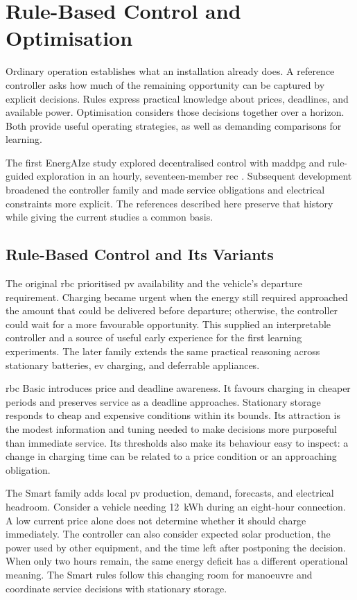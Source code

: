 \section{Rule-Based Control and Optimisation}
\label{sec:rbc-ladder}

Ordinary operation establishes what an installation already does. A reference controller asks how much of the remaining opportunity can be captured by explicit decisions. Rules express practical knowledge about prices, deadlines, and available power. Optimisation considers those decisions together over a horizon. Both provide useful operating strategies, as well as demanding comparisons for learning.

The first EnergAIze study explored decentralised control with \gls{maddpg} and rule-guided exploration in an hourly, seventeen-member \gls{rec} \parencite{fonseca2024energAIze}. Subsequent development broadened the controller family and made service obligations and electrical constraints more explicit. The references described here preserve that history while giving the current studies a common basis.

\subsection{Rule-Based Control and Its Variants}

The original \gls{rbc} prioritised \gls{pv} availability and the vehicle's departure requirement. Charging became urgent when the energy still required approached the amount that could be delivered before departure; otherwise, the controller could wait for a more favourable opportunity. This supplied an interpretable controller and a source of useful early experience for the first learning experiments. The later family extends the same practical reasoning across stationary batteries, \gls{ev} charging, and deferrable appliances.

\gls{rbc} Basic introduces price and deadline awareness. It favours charging in cheaper periods and preserves service as a deadline approaches. Stationary storage responds to cheap and expensive conditions within its bounds. Its attraction is the modest information and tuning needed to make decisions more purposeful than immediate service. Its thresholds also make its behaviour easy to inspect: a change in charging time can be related to a price condition or an approaching obligation.

The Smart family adds local \gls{pv} production, demand, forecasts, and electrical headroom. Consider a vehicle needing 12~kWh during an eight-hour connection. A low current price alone does not determine whether it should charge immediately. The controller can also consider expected solar production, the power used by other equipment, and the time left after postponing the decision. When only two hours remain, the same energy deficit has a different operational meaning. The Smart rules follow this changing room for manoeuvre and coordinate service decisions with stationary storage.

